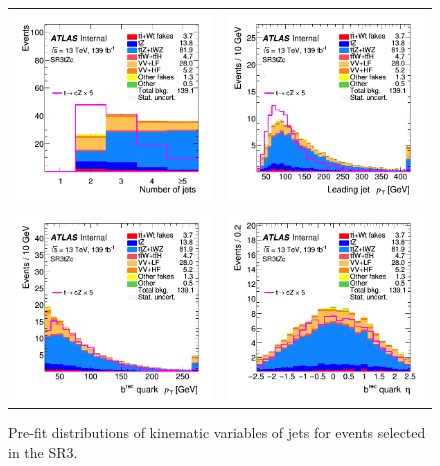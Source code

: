 \begin{figure}[]
	\centering
	\begin{tabular}{cc}
		\includegraphics[width=.35\textwidth]{Appendices/AP6/figures/SR3_UsingDL1rc/nJets} &
		\includegraphics[width=.35\textwidth]{Appendices/AP6/figures/SR3_UsingDL1rc/jet_pt} \\
		\includegraphics[width=.35\textwidth]{Appendices/AP6/figures/SR3_UsingDL1rc/b_pt} & 
		\includegraphics[width=.35\textwidth]{Appendices/AP6/figures/SR3_UsingDL1rc/b_eta} \\
	\end{tabular}
	\caption{Pre-fit distributions of kinematic variables of jets for events selected in the SR3\tZc.
		\ErrStatOnly
		\Blinded
	}%
	\label{fig:sel:sr3:jets}
\end{figure}

\clearpage
\FloatBarrier
